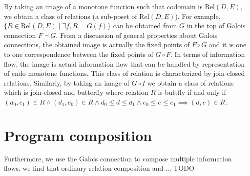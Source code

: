 \documentclass{easychair}
\theoremstyle{definition}
\newcommand{\Rel}{\mathrm{Rel}}
\newcommand{\comp}{\circ}
\begin{document}
By taking an image of a monotone function such that codomain is $\Rel(D, E)$,
we obtain a class of relations (a sub-poset of $\Rel(D, E)$). For
example, $\{ R \in \Rel(D, E) \mid \exists f, R = G(f) \}$ can be obtained from $G$
in the top of Galois connection $F \dashv G$. From a discussion of general
properties about Galois connections, the obtained image is actually the
fixed points of $F \comp G$ and it is one to one correspondence between
the fixed points of $G \comp F$. In terms of information flow, the image
is actual information flow that can be handled by representation of endo
monotone functions. This class of relation is characterized by join-closed relations.
Similarly, by taking an image of $G \comp I$ we obtain a class of relations which is join-closed and butterfly where relation $R$ is buttfly if and only if $(d_{0}, e_{1}) \in R \land (d_{1}, e_{0}) \in R \land d_{0} \leq d \leq d_{1} \land e_{0} \leq e \leq e_{1} \implies (d , e) \in R$.

\section{Program composition}
Furthermore, we use the Galois connection to compose multiple information flows. we find that ordinary relation composition and ... TODO
\end{document}
